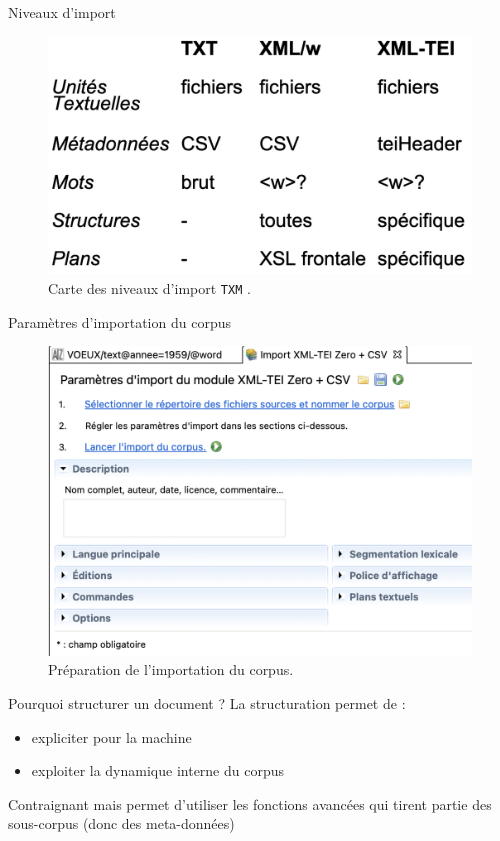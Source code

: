 \documentclass[xetex,xcolor={table,usenames,dvipsnames}]{beamer}
\begin{document}
\begin{frame}{Niveaux d'import}
	\begin{figure}[h] %
		\centering
		\includegraphics[width=.8\linewidth]{img/niveaux_import_txm.png}
		\caption{Carte des niveaux d'import \texttt{TXM} \citep{heiden}.}
		\label{fig:ling_out_TAL}
	\end{figure}
\end{frame}

\begin{frame}{Paramètres d'importation du corpus}
		\begin{figure}[h] %
		\centering
		\includegraphics[width=0.8\linewidth]{img/preparation_import.png}
		\caption{Préparation de l'importation du corpus.}
		\label{fig:ling_out_TAL}
	\end{figure}
\end{frame}

\begin{frame}{Pourquoi structurer un document ?}
	La structuration permet de :
	\begin{itemize}
		\item expliciter pour la machine
		\item exploiter la dynamique interne du corpus
	\end{itemize} 
	
	Contraignant mais permet d'utiliser les fonctions avancées
	qui tirent partie des sous-corpus (donc des meta-données)
\end{frame}
\end{document}
